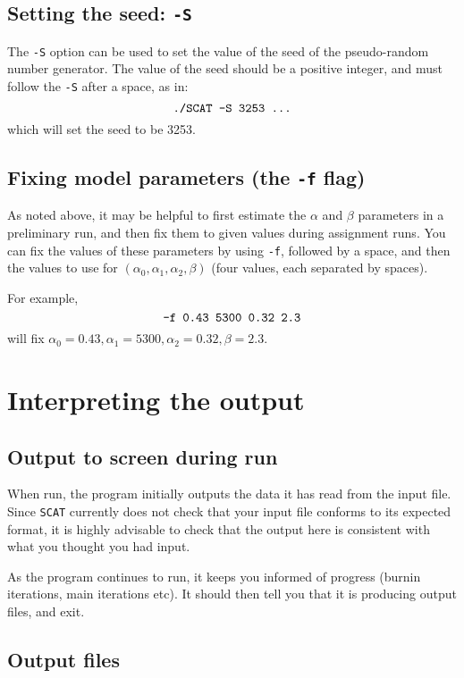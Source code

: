 \documentclass[11pt,titlepage,times,letterpaper]{article}
\def\SCAT{{\tt SCAT} }
\begin{document}
\subsection{Setting the seed: {\tt -S}} \label{Soption}

The {\tt -S} option can be used to set the value of the seed of the
pseudo-random number generator. The value of the seed should be a
positive integer, and must follow the {\tt -S} after a space, as in:
$$\text{{\tt ./SCAT -S 3253 ...}}$$
which will set the seed to be 3253.

\subsection{Fixing model parameters (the {\tt -f} flag)}

As noted above, it may be helpful to first estimate the $\alpha$ and
$\beta$ parameters in a preliminary run, and then fix them to given
values during assignment runs. You can fix the values of these
parameters by using {\tt -f}, followed by a space, and then the values
to use for $(\alpha_0,\alpha_1,\alpha_2,\beta)$ (four values, each
separated by spaces).

For example,
$$\text{\tt -f 0.43 5300 0.32 2.3}$$ will fix $\alpha_0 = 0.43, \alpha_1 =
5300, \alpha_2 = 0.32, \beta = 2.3$.





\section{Interpreting the output} \label{interpret}

\subsection{Output to screen during run}

When run, the program initially outputs the data it has read from the
input file. Since \SCAT currently does not check that your input file
conforms to its expected format, it is highly advisable to check that
the output here is consistent with what you thought you had input.

As the program continues to run, it keeps you informed of progress
(burnin iterations, main iterations etc). It should then tell you
that it is producing output files, and exit.

\subsection{Output files} \label{out}
\end{document}
